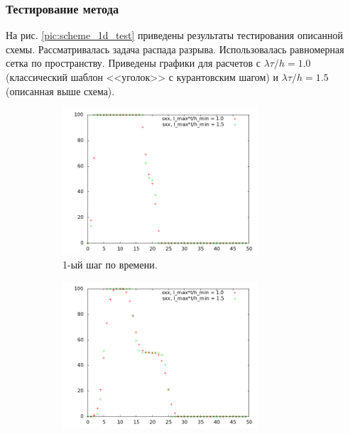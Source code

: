 \clearpage
\newpage

\subsubsection{Тестирование метода}

На рис. \ref{pic:scheme_1d_test} приведены результаты тестирования описанной схемы. Рассматривалась задача распада разрыва. Использовалась равномерная сетка по пространству. Приведены графики для расчетов с $\lambda \tau / h = 1.0$ (классический шаблон <<уголок>> с курантовским шагом) и $\lambda \tau / h = 1.5$ (описанная выше схема).

\begin{figure}[htp]
\begin{subfigure}[b]{0.5\textwidth}
\centering
\includegraphics[width=0.8\textwidth]{png/big-sigma-test-results-1d/snap-1.png}
\caption{1-ый шаг по времени.}
\end{subfigure}
\begin{subfigure}[b]{0.5\textwidth}
\centering
\includegraphics[width=0.8\textwidth]{png/big-sigma-test-results-1d/snap-3.png}

\end{subfigure}
\end{figure}
